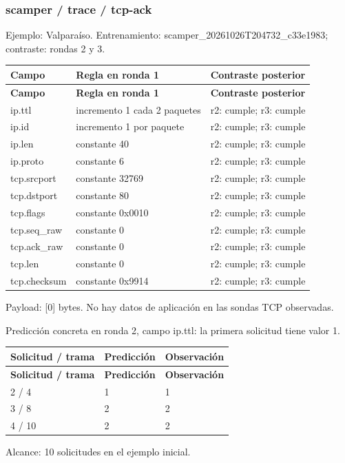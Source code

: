 \subsubsection{scamper / trace / tcp-ack}
Ejemplo: Valparaíso. Entrenamiento: scamper\_\allowbreak{}20261026T204732\_\allowbreak{}c33e1983; contraste: rondas 2 y 3. 

\begingroup
\fontsize{9}{11}\selectfont
\addtocounter{table}{-1}
\begin{longtable}{p{3.1cm}p{5.8cm}p{5.1cm}}
\toprule
\textbf{Campo} & \textbf{Regla en ronda 1} & \textbf{Contraste posterior} \\ \midrule
\endfirsthead
\toprule
\textbf{Campo} & \textbf{Regla en ronda 1} & \textbf{Contraste posterior} \\ \midrule
\endhead
ip.ttl & incremento 1 cada 2 paquetes & r2: cumple; r3: cumple \\
ip.id & incremento 1 por paquete & r2: cumple; r3: cumple \\
ip.len & constante 40 & r2: cumple; r3: cumple \\
ip.proto & constante 6 & r2: cumple; r3: cumple \\
tcp.srcport & constante 32769 & r2: cumple; r3: cumple \\
tcp.dstport & constante 80 & r2: cumple; r3: cumple \\
tcp.flags & constante 0x0010 & r2: cumple; r3: cumple \\
tcp.seq\_\allowbreak{}raw & constante 0 & r2: cumple; r3: cumple \\
tcp.ack\_\allowbreak{}raw & constante 0 & r2: cumple; r3: cumple \\
tcp.len & constante 0 & r2: cumple; r3: cumple \\
tcp.checksum & constante 0x9914 & r2: cumple; r3: cumple \\
\bottomrule
\end{longtable}
\endgroup
Payload: [0] bytes. No hay datos de aplicación en las sondas TCP observadas.

Predicción concreta en ronda 2, campo ip.ttl: la primera solicitud tiene valor 1. 

\begingroup
\fontsize{9}{11}\selectfont
\addtocounter{table}{-1}
\begin{longtable}{p{3.2cm}p{5.1cm}p{5.1cm}}
\toprule
\textbf{Solicitud / trama} & \textbf{Predicción} & \textbf{Observación} \\ \midrule
\endfirsthead
\toprule
\textbf{Solicitud / trama} & \textbf{Predicción} & \textbf{Observación} \\ \midrule
\endhead
2 / 4 & 1 & 1 \\
3 / 8 & 2 & 2 \\
4 / 10 & 2 & 2 \\
\bottomrule
\end{longtable}
\endgroup
Alcance: 10 solicitudes en el ejemplo inicial. 


